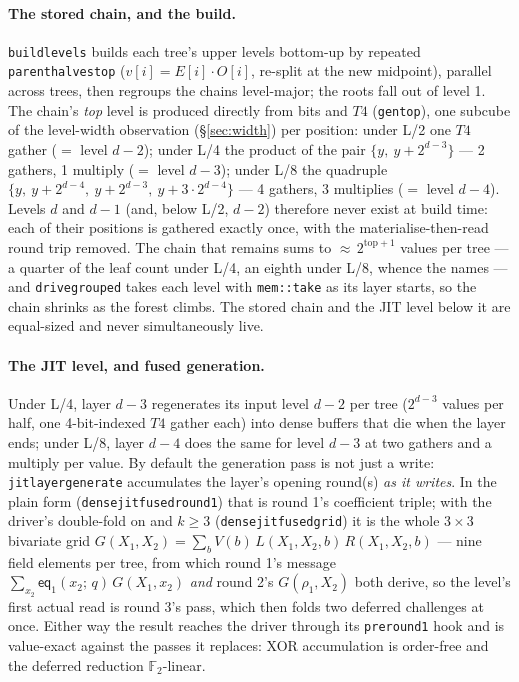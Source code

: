 \documentclass[11pt]{article}
\newcommand{\F}{\mathbb{F}}
\newcommand{\Ftwo}{\F_2}
\newcommand{\eq}{\mathsf{eq}}
\newcommand{\code}[1]{{\def\_{\textunderscore\allowbreak}\texttt{#1}}}
\theoremstyle{definition}
\begin{document}
\paragraph{The stored chain, and the build.}
\code{build\_levels} builds each tree's upper levels bottom-up by
repeated \code{parent\_halves\_top} ($v[i] = E[i]\cdot O[i]$,
re-split at the new midpoint), parallel across trees, then regroups the
chains level-major; the roots fall out of level 1.  The chain's
\emph{top} level is produced directly from bits and $T4$
(\code{gen\_top}), one subcube of the level-width observation
(\S\ref{sec:width}) per position: under L/2 one $T4$ gather ($=$ level
$d{-}2$); under L/4 the product of the pair $\{y,\ y{+}2^{d-3}\}$ ---
2 gathers, 1 multiply ($=$ level $d{-}3$); under L/8 the quadruple
$\{y,\ y{+}2^{d-4},\ y{+}2^{d-3},\ y{+}3\cdot 2^{d-4}\}$ --- 4 gathers,
3 multiplies ($=$ level $d{-}4$).  Levels $d$ and $d{-}1$ (and, below
L/2, $d{-}2$) therefore never exist at build time: each of their
positions is gathered exactly once, with the materialise-then-read
round trip removed.  The chain that remains sums to
${\approx}\,2^{\mathrm{top}+1}$ values per tree --- a quarter of the
leaf count under L/4, an eighth under L/8, whence the names --- and
\code{drive\_grouped} takes each level with \code{mem::take} as its
layer starts, so the chain shrinks as the forest climbs.  The stored
chain and the JIT level below it are equal-sized and never
simultaneously live.

\paragraph{The JIT level, and fused generation.}
Under L/4, layer $d{-}3$ regenerates its input level $d{-}2$ per tree
($2^{d-3}$ values per half, one 4-bit-indexed $T4$ gather each) into
dense buffers that die when the layer ends; under L/8, layer $d{-}4$
does the same for level $d{-}3$ at two gathers and a multiply per
value.  By default the generation pass is not just a write:
\code{jit\_layer\_generate} accumulates the layer's opening round(s)
\emph{as it writes}.  In the plain form
(\code{dense\_jit\_fused\_round1}) that is round 1's coefficient
triple; with the driver's double-fold on and $k \ge 3$
(\code{dense\_jit\_fused\_grid}) it is the whole $3{\times}3$
bivariate grid
$G(X_1, X_2) = \sum_b V(b)\,L(X_1, X_2, b)\,R(X_1, X_2, b)$ --- nine
field elements per tree, from which round 1's message
$\sum_{x_2} \eq_1(x_2;\, q)\,G(X_1, x_2)$ \emph{and} round 2's
$G(\rho_1, X_2)$ both derive, so the level's first actual read is
round 3's pass, which then folds two deferred challenges at once.
Either way the result reaches the driver through its
\code{pre\_round1} hook and is value-exact against the passes it
replaces: XOR accumulation is order-free and the deferred reduction
$\Ftwo$-linear.
\end{document}
